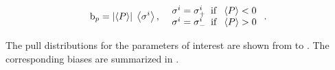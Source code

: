 \begin{equation}
{\rm b}_p = \left|\left<P\right>\right| \; \left<\sigma^i\right>,\;\; \left.
  \begin{array}{ll}
    \sigma^i = \sigma^i_+ \;\;{\rm if}\;\; \left<P\right> < 0 \\
    \sigma^i = \sigma^i_- \;\;{\rm if}\;\; \left<P\right> > 0
  \end{array} \right. .
\label{bias_def}
\end{equation}

The pull distributions for the parameters of interest are shown from  to .
The corresponding biases are summarized in .

\begin{figure}[!h]
  \centering
  \begin{subfigure}{0.5\textwidth}
    \scalebox{0.60}{}
    \caption{}
    \label{pull_ASMag2_bin1}
  \end{subfigure}%
  \hfill%
  \begin{subfigure}{0.5\textwidth}
    \scalebox{0.60}{}
    \caption{}
    \label{pull_ASPhase_bin1}
  \end{subfigure}
  \begin{subfigure}{0.5\textwidth}
    \scalebox{0.60}{}
    \caption{}
    \label{pull_ASMag2_bin2}
  \end{subfigure}%
  \hfill%
  \begin{subfigure}{0.5\textwidth}
    \scalebox{0.60}{}
    \caption{}
    \label{pull_ASPhase_bin2}
  \end{subfigure}
  \begin{subfigure}{0.5\textwidth}
    \scalebox{0.60}{}
    \caption{}
    \label{pull_ASMag2_bin2}
  \end{subfigure}%
  \hfill%
  \begin{subfigure}{0.5\textwidth}
    \scalebox{0.60}{}
    \caption{}
    \label{pull_ASPhase_bin3}
  \end{subfigure}
  \begin{subfigure}{0.5\textwidth}

\end{subfigure}
\end{figure}
